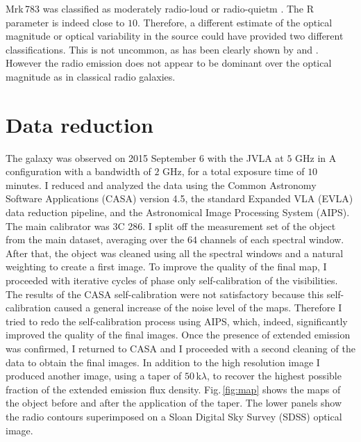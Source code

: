 \documentclass[../main.tex]{subfiles}
\begin{document}
Mrk\,783 was classified as moderately radio-loud \citep{Berton15a} or radio-quietm \citep{Doi13}. 
The R parameter is indeed close to $10$. 
Therefore, a different estimate of the optical magnitude or optical variability in the source could have provided two different classifications. 
This is not uncommon, as has been clearly shown by \citet{Ho01} and \citet{Kharb14}.
However the radio emission does not appear to be dominant over the optical magnitude as in classical radio galaxies.




\section{Data reduction}
\label{sec:datared_casa}

The galaxy was observed on 2015 September 6 with the JVLA at $5$ GHz in A configuration with a bandwidth of $2$ GHz, for a total exposure time of $10$ minutes.
I reduced and analyzed the data using the Common Astronomy Software Applications (CASA) version 4.5, the standard Expanded VLA (EVLA) data reduction pipeline, and the Astronomical Image Processing System (AIPS).
The main calibrator was 3C 286. 
I split off the measurement set of the object from the main dataset, averaging over the $64$ channels of each spectral window.
After that, the object was cleaned using all the spectral windows and a natural weighting to create a first image.
To improve the quality of the final map, I proceeded with iterative cycles of phase only self-calibration of the visibilities.
The results of the CASA self-calibration were not satisfactory because this self-calibration caused a general increase of the noise level of the maps.
Therefore I tried to redo the self-calibration process using AIPS, which, indeed, significantly improved the quality of the final images.
Once the presence of extended emission was confirmed, I returned to CASA and I proceeded with a second cleaning of the data to obtain the final images.
In addition to the high resolution image I produced another image, using a taper of $50\,$k$\lambda$, to recover the highest possible fraction of the extended emission flux density.
Fig.\,\ref{fig:map} shows the maps of the object before and after the application of the taper.  
The lower panels show the radio contours superimposed on a Sloan Digital Sky Survey (SDSS) optical image.
\end{document}
